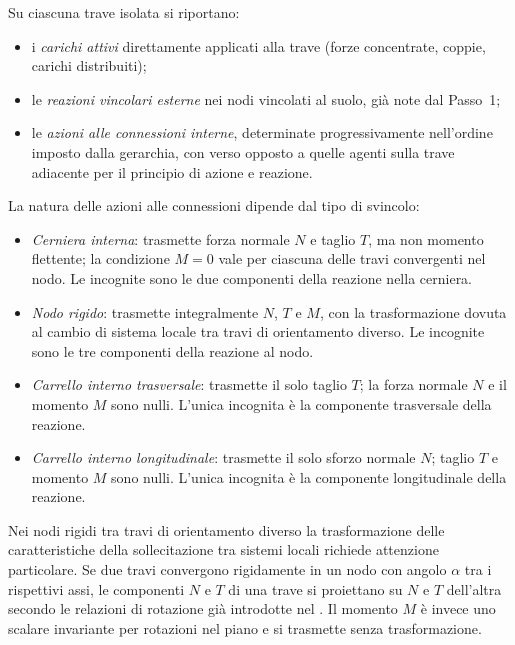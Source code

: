 Su ciascuna trave isolata si riportano:
\begin{itemize}
	\item i \emph{carichi attivi} direttamente
	applicati alla trave (forze concentrate,
	coppie, carichi distribuiti);
	\item le \emph{reazioni vincolari esterne}
	nei nodi vincolati al suolo, già note
	dal Passo~1;
	\item le \emph{azioni alle connessioni
		interne}, determinate progressivamente
	nell'ordine imposto dalla gerarchia,
	con verso opposto a quelle agenti sulla
	trave adiacente per il principio di
	azione e reazione.
\end{itemize}

La natura delle azioni alle connessioni dipende
dal tipo di svincolo:
\begin{itemize}
	\item \emph{Cerniera interna}: trasmette
	forza normale $N$ e taglio $T$, ma non
	momento flettente; la condizione $M = 0$
	vale per ciascuna delle travi convergenti
	nel nodo. Le incognite sono le due componenti
	della reazione nella cerniera.
	
	\item \emph{Nodo rigido}: trasmette
	integralmente $N$, $T$ e $M$, con la
	trasformazione dovuta al cambio di sistema
	locale tra travi di orientamento diverso.
	Le incognite sono le tre componenti della
	reazione al nodo.
	
	\item \emph{Carrello interno trasversale}:
	trasmette il solo taglio $T$; la forza
	normale $N$ e il momento $M$ sono nulli.
	L'unica incognita è la componente
	trasversale della reazione.
	
	\item \emph{Carrello interno longitudinale}:
	trasmette il solo sforzo normale $N$;
	taglio $T$ e momento $M$ sono nulli.
	L'unica incognita è la componente
	longitudinale della reazione.
\end{itemize}

\begin{oss}
	Nei nodi rigidi tra travi di orientamento
	diverso la trasformazione delle caratteristiche
	della sollecitazione tra sistemi locali richiede
	attenzione particolare. Se due travi convergono
	rigidamente in un nodo con angolo $\alpha$ tra
	i rispettivi assi, le componenti $N$ e $T$
	di una trave si proiettano su $N$ e $T$
	dell'altra secondo le relazioni di rotazione
	già introdotte nel .
	Il momento $M$ è invece uno scalare invariante
	per rotazioni nel piano e si trasmette senza
	trasformazione.
\end{oss}

